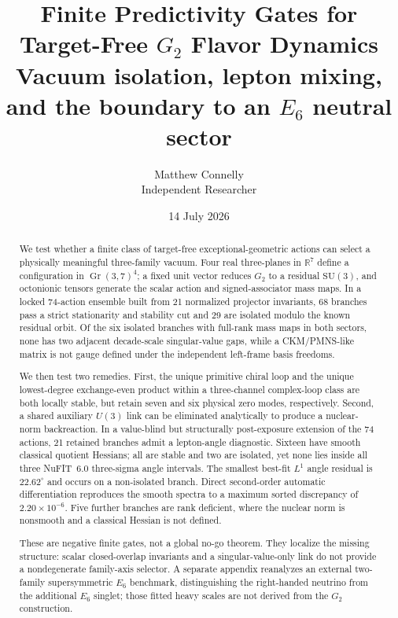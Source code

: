 \documentclass[11pt]{article}
\title{\textbf{Finite Predictivity Gates for Target-Free $G_2$ Flavor Dynamics}\\[0.35em]
\large Vacuum isolation, lepton mixing, and the boundary to an $E_6$ neutral sector}
\author{Matthew Connelly\\\small Independent Researcher}
\date{14 July 2026}
\newcommand{\Gr}{\operatorname{Gr}}
\newcommand{\SU}{\mathrm{SU}}
\begin{document}
\maketitle

\begin{abstract}
We test whether a finite class of target-free exceptional-geometric actions can select a physically meaningful three-family vacuum.  Four real three-planes in $\mathbb R^7$ define a configuration in $\Gr(3,7)^4$; a fixed unit vector reduces $G_2$ to a residual $\SU(3)$, and octonionic tensors generate the scalar action and signed-associator mass maps.  In a locked 74-action ensemble built from 21 normalized projector invariants, 68 branches pass a strict stationarity and stability cut and 29 are isolated modulo the known residual orbit.  Of the six isolated branches with full-rank mass maps in both sectors, none has two adjacent decade-scale singular-value gaps, while a CKM/PMNS-like matrix is not gauge defined under the independent left-frame basis freedoms.

We then test two remedies.  First, the unique primitive chiral loop and the unique lowest-degree exchange-even product within a three-channel complex-loop class are both locally stable, but retain seven and six physical zero modes, respectively.  Second, a shared auxiliary $U(3)$ link can be eliminated analytically to produce a nuclear-norm backreaction.  In a value-blind but structurally post-exposure extension of the 74 actions, 21 retained branches admit a lepton-angle diagnostic.  Sixteen have smooth classical quotient Hessians; all are stable and two are isolated, yet none lies inside all three NuFIT~6.0 three-sigma angle intervals.  The smallest best-fit $L^1$ angle residual is $22.62^\circ$ and occurs on a non-isolated branch.  Direct second-order automatic differentiation reproduces the smooth spectra to a maximum sorted discrepancy of $2.20\times10^{-6}$.  Five further branches are rank deficient, where the nuclear norm is nonsmooth and a classical Hessian is not defined.

These are negative finite gates, not a global no-go theorem.  They localize the missing structure: scalar closed-overlap invariants and a singular-value-only link do not provide a nondegenerate family-axis selector.  A separate appendix reanalyzes an external two-family supersymmetric $E_6$ benchmark, distinguishing the right-handed neutrino from the additional $E_6$ singlet; those fitted heavy scales are not derived from the $G_2$ construction.
\end{abstract}
\end{document}
